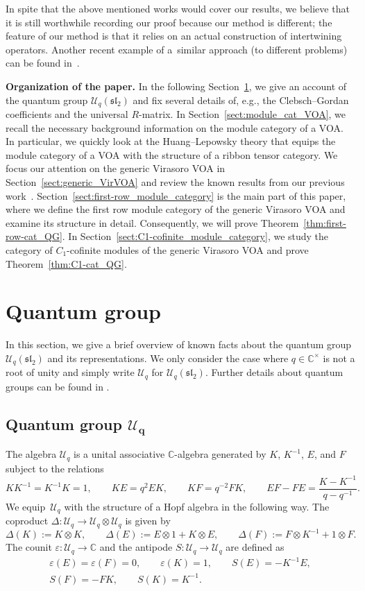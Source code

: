 \documentclass[10pt,a4paper]{amsart}
\numberwithin{equation}{section}
\newcommand{\bC}{\mathbb{C}}
\newcommand{\cU}{\mathcal{U}}
\newcommand{\fsl}{\mathfrak{sl}}
\newcommand{\UEA}{\cU}
\newcommand{\Uq}{\UEA_{q}}
\newcommand{\QGcoprod}{\Delta}
\newcommand{\QGcounit}{\varepsilon}
\newcommand{\QGantipode}{S}
\begin{document}
In spite that the above mentioned works would cover our results, we believe that it is still worthwhile recording our proof because our method is different;
the feature of our method is that it relies on an actual construction of intertwining operators.
Another recent example of a~similar approach (to different problems) can be found in~\cite{nakano2024fusion}.



{\bf Organization of the paper.}
In the following Section~\ref{sect:quantum_group}, we give an account of the quantum group $\Uq(\fsl_{2})$
and fix several details of, e.g., the Clebsch--Gordan coefficients and the universal $R$-matrix.
In Section~\ref{sect:module_cat_VOA}, we recall the necessary background information on the module category of a VOA.
In particular, we quickly look at the Huang--Lepowsky theory that equips the module category of a VOA with the structure of a ribbon tensor category.
We focus our attention on the generic Virasoro VOA in Section~\ref{sect:generic_VirVOA} and review the known results from our previous work~\cite{KoshidaKytola2022}.
Section~\ref{sect:first-row_module_category} is the main part of this paper, where we define the first row module category of the generic Virasoro VOA and examine its structure in detail. Consequently, we will prove Theorem~\ref{thm:first-row-cat_QG}.
In Section~\ref{sect:C1-cofinite_module_category}, we study the category of $C_{1}$-cofinite modules of the generic Virasoro VOA and prove Theorem~\ref{thm:C1-cat_QG}.



\section{Quantum group}
\label{sect:quantum_group}
In this section, we give a brief overview of known facts about the quantum group $\Uq (\fsl_{2})$ and its representations.
We only consider the case where $q\in\bC^{\times}$ is not a root of unity and simply write $\Uq$ for $\Uq (\fsl_{2})$.
Further details about quantum groups can be found in \cite{chari1995guide, Kassel-quantum_groups,Lusztig1993}.

\subsection[Quantum group U\_q]{Quantum group $\boldsymbol{\Uq}$}
The algebra $\Uq$ is a unital associative $\bC$-algebra generated by
$K$, $K^{-1}$, $E$, and $F$ subject to the relations
\[
 KK^{-1}=K^{-1}K=1, \qquad
 KE=q^{2}EK, \qquad KF=q^{-2}FK, \qquad
 EF-FE=\frac{K-K^{-1}}{q-q^{-1}}.
 \]
We equip~$\Uq$ with the structure of a Hopf algebra in the following way.
The coproduct $\QGcoprod\colon \Uq\to \Uq\otimes\Uq$ is given by
\[
 \QGcoprod (K) :=K\otimes K, \qquad
 \QGcoprod (E) :=E\otimes 1+K\otimes E, \qquad
 \QGcoprod (F) :=F\otimes K^{-1} +1\otimes F.
 \]
The counit $\QGcounit \colon \Uq\to\bC$ and the antipode $\QGantipode\colon \Uq\to\Uq$ are defined as
\begin{gather*}
 \QGcounit (E)=\QGcounit (F)=0, \qquad \QGcounit (K)=1, \qquad
 \QGantipode (E)=-K^{-1}E, \\ \QGantipode (F)=-FK, \qquad \QGantipode (K)=K^{-1}.
\end{gather*}
\end{document}

